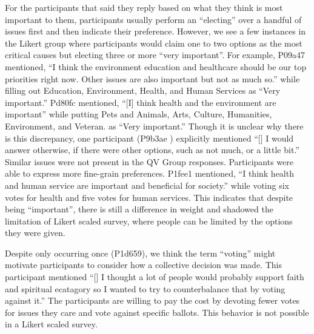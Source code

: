 For the participants that said they reply based on what they think is most important to them, 
participants usually perform an ``electing'' over a handful of issues first and then indicate their preference.
However, we see a few instances in the Likert group where participants would claim one to two options as the most critical causes but electing three or more ``very important''.
For example, P09a47 mentioned, ``I think the environment education and healthcare should be our top priorities right now. Other issues are also important but not as much so.''
while filling out Education, Environment, Health, and Human Services as ``Very important.'' 
Pd80fc mentioned, ``[I] think health and the environment are important'' while putting Pets and Animals, Arts, Culture, Humanities, Environment, and Veteran. as ``Very important.'' 
Though it is unclear why there is this discrepancy, one participant (P9b3ae
) explicitly mentioned ``[\textellipsis] I would answer otherwise, if there were other options, such as not much, or a little bit.''
Similar issues were not present in the QV Group responses.
Participants were able to express more fine-grain preferences.
P1fee1 mentioned, ``I think health and human service are important and beneficial for society.'' while voting six votes for health and five votes for human services. This indicates that despite being ``important'', there is still a difference in weight and shadowed the limitation of Likert scaled survey, where people can be limited by the options they were given.\par

Despite only occurring once (P1d659), we think the term ``voting'' might motivate participants to consider how a collective decision was made.
This participant mentioned ``[\textellipsis] I thought a lot of people would probably support faith and spiritual ecatagory  so I wanted to try to counterbalance that by voting against it.'' The participants are willing to pay the cost by devoting fewer votes for issues they care and vote against specific ballots. This behavior is not possible in a Likert scaled survey.\par

